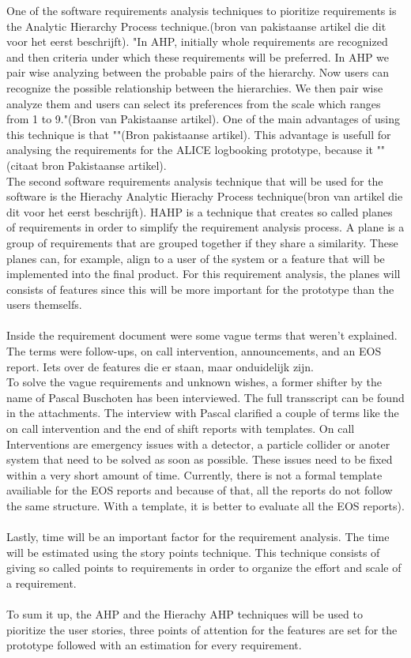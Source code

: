 \documentclass[paper=a4, fontsize=11pt,twoside]{scrartcl}	%
\begin{document}
One of the software requirements analysis techniques to pioritize requirements is the Analytic Hierarchy Process technique.(bron van pakistaanse artikel die dit voor het eerst beschrijft). "In AHP,   initially whole requirements are recognized and then criteria under which these requirements will be preferred. In AHP we pair wise analyzing  between  the  probable  pairs  of  the  hierarchy. 
Now users can recognize the possible relationship between 
the hierarchies. We then pair wise analyze them and users can select its preferences from the scale which ranges from 
1 to 9."(Bron van Pakistaanse artikel). One of the main advantages of using this technique is that ""(Bron pakistaanse artikel). This advantage is usefull for analysing the requirements for the ALICE logbooking prototype,  because it ""(citaat bron Pakistaanse artikel). 
\\
The second software requirements analysis technique that will be used for the software is the Hierachy Analytic Hierachy Process technique(bron van artikel die dit voor het eerst beschrijft). HAHP is a technique that creates so called planes of requirements in order to simplify the requirement analysis process. A plane is a group of requirements that are grouped together if they share a similarity. These planes can, for example, align to a user of the system or a feature that will be implemented into the final product. For this requirement analysis, the planes will consists of features since this will be more important for the prototype than the users themselfs.
\\ \\
Inside the requirement document were some vague terms that weren't explained. The terms were follow-ups, on call intervention, announcements, and an EOS report. Iets over de features die er staan, maar onduidelijk zijn. \\
To solve the vague requirements and unknown wishes, a former shifter by the name of Pascal Buschoten has been interviewed. The full transscript can be found in the attachments. The interview with Pascal clarified a couple of terms like the on call intervention and the end of shift reports with templates. On call Interventions are emergency issues with a detector, a particle collider or anoter system that need to be solved as soon as possible. These issues need to be fixed within a very short amount of time. Currently, there is not a formal template availiable for the EOS reports  and because of that, all the reports do not follow the same structure. With a template, it is better to evaluate all the EOS reports).
\\ \\
Lastly, time will be an important factor for the requirement analysis. The time will be estimated using the story points technique. This technique consists of giving so called points to requirements in order to organize the effort and scale of a requirement.
\\ \\
To sum it up, the AHP and the Hierachy AHP techniques will be used to pioritize the user stories, three points of attention for the features are set for the prototype followed with an estimation for every requirement.
\end{document}
